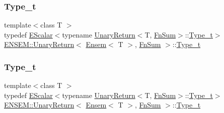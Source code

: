 \subsubsection{\texorpdfstring{Type\_t}{Type\_t}\hspace{0.1cm}{\footnotesize\ttfamily [1/3]}}
{\footnotesize\ttfamily template$<$class T $>$ \\
typedef \mbox{\hyperlink{classENSEM_1_1EScalar}{E\+Scalar}}$<$typename \mbox{\hyperlink{structENSEM_1_1UnaryReturn}{Unary\+Return}}$<$T, \mbox{\hyperlink{structENSEM_1_1FnSum}{Fn\+Sum}}$>$\+::\mbox{\hyperlink{structENSEM_1_1UnaryReturn_3_01Ensem_3_01T_01_4_00_01FnSum_01_4_ad99eb2820cca4a76378ee89c9abbf4e3}{Type\+\_\+t}}$>$ \mbox{\hyperlink{structENSEM_1_1UnaryReturn}{E\+N\+S\+E\+M\+::\+Unary\+Return}}$<$ \mbox{\hyperlink{classENSEM_1_1Ensem}{Ensem}}$<$ T $>$, \mbox{\hyperlink{structENSEM_1_1FnSum}{Fn\+Sum}} $>$\+::\mbox{\hyperlink{structENSEM_1_1UnaryReturn_3_01Ensem_3_01T_01_4_00_01FnSum_01_4_ad99eb2820cca4a76378ee89c9abbf4e3}{Type\+\_\+t}}}

\mbox{\label{structENSEM_1_1UnaryReturn_3_01Ensem_3_01T_01_4_00_01FnSum_01_4_ad99eb2820cca4a76378ee89c9abbf4e3}} 
\subsubsection{\texorpdfstring{Type\_t}{Type\_t}\hspace{0.1cm}{\footnotesize\ttfamily [2/3]}}
{\footnotesize\ttfamily template$<$class T $>$ \\
typedef \mbox{\hyperlink{classENSEM_1_1EScalar}{E\+Scalar}}$<$typename \mbox{\hyperlink{structENSEM_1_1UnaryReturn}{Unary\+Return}}$<$T, \mbox{\hyperlink{structENSEM_1_1FnSum}{Fn\+Sum}}$>$\+::\mbox{\hyperlink{structENSEM_1_1UnaryReturn_3_01Ensem_3_01T_01_4_00_01FnSum_01_4_ad99eb2820cca4a76378ee89c9abbf4e3}{Type\+\_\+t}}$>$ \mbox{\hyperlink{structENSEM_1_1UnaryReturn}{E\+N\+S\+E\+M\+::\+Unary\+Return}}$<$ \mbox{\hyperlink{classENSEM_1_1Ensem}{Ensem}}$<$ T $>$, \mbox{\hyperlink{structENSEM_1_1FnSum}{Fn\+Sum}} $>$\+::\mbox{\hyperlink{structENSEM_1_1UnaryReturn_3_01Ensem_3_01T_01_4_00_01FnSum_01_4_ad99eb2820cca4a76378ee89c9abbf4e3}{Type\+\_\+t}}}

